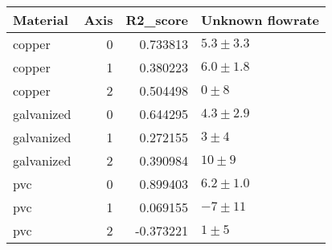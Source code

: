 \begin{tabular}{lrrl}
\toprule
Material & Axis & R2_score & Unknown flowrate \\
\midrule
copper & 0 & 0.733813 & $5.3 \pm 3.3$ \\
copper & 1 & 0.380223 & $6.0 \pm 1.8$ \\
copper & 2 & 0.504498 & $0 \pm 8$ \\
galvanized & 0 & 0.644295 & $4.3 \pm 2.9$ \\
galvanized & 1 & 0.272155 & $3 \pm 4$ \\
galvanized & 2 & 0.390984 & $10 \pm 9$ \\
pvc & 0 & 0.899403 & $6.2 \pm 1.0$ \\
pvc & 1 & 0.069155 & $-7 \pm 11$ \\
pvc & 2 & -0.373221 & $1 \pm 5$ \\
\bottomrule
\end{tabular}
